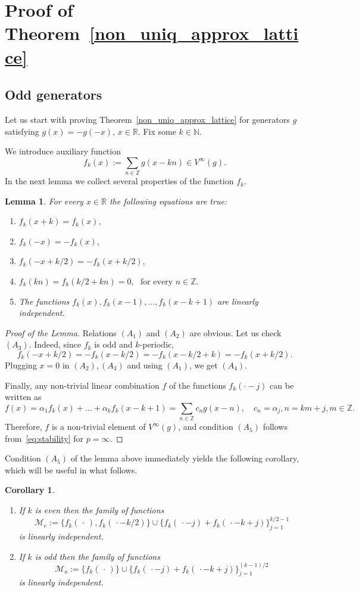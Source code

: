 \documentclass[12pt]{amsart}
\numberwithin{equation}{section}
\newtheorem{lemma}[theorem]{Lemma}
\newtheorem{corollary}[theorem]{Corollary} \newcommand{\La}{\Lambda}
\newcommand{\R}{{\mathbb R}} \newcommand{\Q}{{\mathbb Q}} \newcommand{\Z}{{\mathbb Z}} \newcommand{\N}{{\mathbb N}}
\begin{document}
\section{Proof of Theorem~\ref{non_uniq_approx_lattice}}
\subsection{Odd generators}

Let us start with proving Theorem~\ref{non_uniq_approx_lattice} for generators $g$ satisfying $g(x)=-g(-x), \, x\in \R.  $ 
Fix some $k\in \N.$

We introduce auxiliary function
$$f_k(x):=\sum_{n\in\Z}g(x-kn)\in V^\infty(g).$$
In the next lemma we collect several properties of the function $f_k$.  

\begin{lemma}\label{lem:f_k_properties}
    For every $x\in \R$ the following equations are true:
\begin{enumerate}
    \item[$(A_1)$]  $f_k(x+k) = f_k(x),$
    \item[$(A_2)$] $ f_k(-x)=-f_k(x),$
    \item[$(A_3)$] $f_k(-x+k/2)= -f_k(x+k/2),$
    \item[$(A_4)$] $f_k(kn)=f_k(k/2+kn)=0, \, \, \text{ for every }n\in\Z.$
    \item[$(A_5)$] The functions $f_k(x), f_k(x-1),\dots,f_k(x-k+1)$ are linearly independent.
\end{enumerate}
\end{lemma}
\begin{proof}[Proof of the Lemma]
Relations $(A_1)$ and $(A_2)$ are obvious.
   Let us check $(A_3)$. Indeed, since $f_k$ is odd and $k$-periodic, 
$$f_k(-x+k/2)=-f_k(x-k/2)=-f_k(x-k/2+k)=-f_k(x+k/2).$$ Plugging $x = 0$ in $(A_2),(A_3)$ and using $(A_1)$, we get $(A_4).$ 

Finally, any non-trivial linear combination $f$ of the functions $f_k(\cdot-j)$ can be written as
$$f(x)=\alpha_1f_k(x)+\dots+\alpha_kf_k(x-k+1)=\sum_{n\in\Z}c_ng(x-n),\quad c_n=\alpha_j, n=km+j, m\in\Z.$$Therefore,  $f$ is a non-trivial element of $V^\infty(g)$, and 
condition $(A_5)$ follows from~\eqref{eq:stability} for $p=\infty$.
\end{proof}



Condition $(A_5)$ of the lemma above immediately yields the following corollary, which will be useful in what follows.
\begin{corollary}\label{claim:linear_indep}
\begin{enumerate} 
    \item[$(i)$] If $k$ is even then the family of functions
$$\mathcal{M}_e:=\{f_{k}(\,\cdot\,),f_k( \,\cdot-k/2)\}\cup\{f_k(\,\cdot-j)+f_k(\,\cdot-k+j)\}_{j=1}^{k/2-1}$$
is linearly independent.
    \item[$(ii)$]  If $k$ is odd then the family of functions
$$\mathcal{M}_o:=\{f_{k}(\,\cdot\,)\}\cup\{f_k(\,\cdot-j)+f_k(\,\cdot-k+j)\}_{j=1}^{(k-1)/2}$$
is linearly independent.
\end{enumerate}
\end{corollary}
\end{document}
